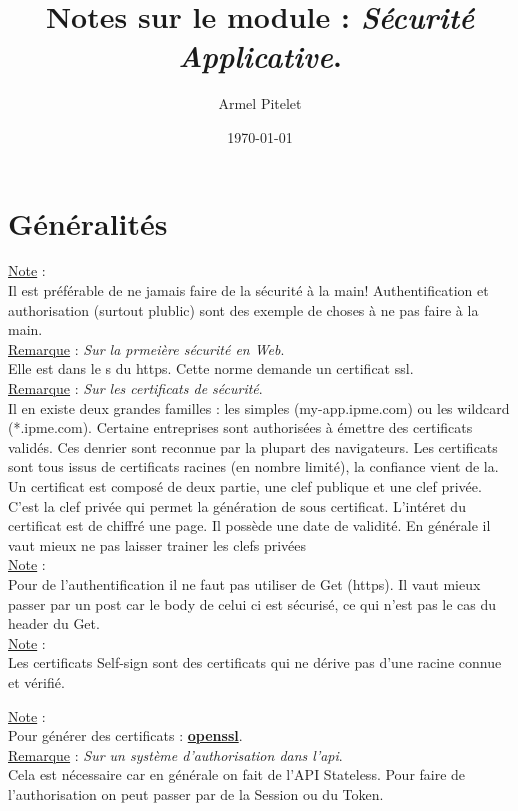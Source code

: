 \documentclass[a4paper,12pt,twoside]{article}
\title{Notes sur le module : \textit{Sécurité Applicative}.}
\author{Armel Pitelet}
\date{\today}
\newcommand{\urlcolor}{magenta}  %
\newcommand{\keycolor}{purple} %
\newcommand{\rem}[2]{\noindent\underline{Remarque} : \textit{#1}.\\ \indent #2}
\newcommand{\note}[1]{\noindent\underline{Note} : \\ \indent #1}
\newcommand{\keyref}[2]{\hypersetup{urlcolor=\keycolor} \href{#1}{\textbf{#2}}\hypersetup{urlcolor=\urlcolor}}
\begin{document}
\maketitle
\tableofcontents

\section{Généralités}

\note{Il est préférable de ne jamais faire de la sécurité à la main!  Authentification et authorisation (surtout plublic) sont des exemple de choses à ne pas faire à la main.}\\

\rem{Sur la prmeière sécurité en Web}{Elle est dans le s du https. Cette norme demande un certificat ssl.}\\

\rem{Sur les certificats de sécurité}{Il en existe deux grandes familles : les simples (my-app.ipme.com) ou les wildcard (*.ipme.com). Certaine entreprises sont authorisées à émettre des certificats validés. Ces denrier sont reconnue par la plupart des navigateurs. Les certificats sont tous issus de certificats racines (en nombre limité), la confiance vient de la. Un certificat est composé de deux partie, une clef publique et une clef privée. C'est la clef privée qui permet la génération de sous certificat. L'intéret du certificat est de chiffré une page. Il possède une date de validité. En générale il vaut mieux ne pas laisser trainer les clefs privées}\\

\note{Pour de l'authentification il ne faut pas utiliser de Get (https). Il vaut mieux passer par un post car le body de celui ci est sécurisé, ce qui n'est pas le cas du header du Get.}\\

\note{Les certificats Self-sign sont des certificats qui ne dérive pas d'une racine connue et vérifié. }

\note{Pour générer des certificats : \keyref{https://www.openssl.org/}{openssl}.}\\

\rem{Sur un système d'authorisation dans l'api}{Cela est nécessaire car en générale on fait de l'API Stateless. Pour faire de l'authorisation on peut passer par de la Session ou du Token.}\\
\end{document}
